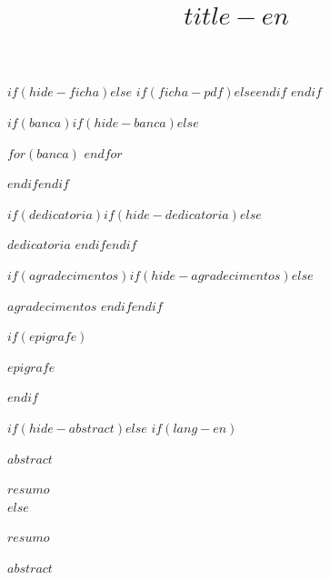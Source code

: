 \documentclass[a4paper,12pt,oneside,onecolumn,final,fleqn]{repUERJ}
\title{$title-en$}
\begin{document}

\frontmatter

\capa
\folhaderosto
$if(hide-ficha)$$else$
$if(ficha-pdf)$$else$\fichacatalografica{}$endif$
$endif$

$if(banca)$$if(hide-banca)$$else$
\begin{folhadeaprovacao}
$for(banca)$  
$endfor$\end{folhadeaprovacao}
$endif$$endif$

$if(dedicatoria)$$if(hide-dedicatoria)$$else$

\vfill
$dedicatoria$
$endif$$endif$

$if(agradecimentos)$$if(hide-agradecimentos)$$else$

$agradecimentos$
$endif$$endif$

$if(epigrafe)$
\pretextualchapter{}

  \vfill
  \begin{flushright}
    $epigrafe$
  \end{flushright}
$endif$

$if(hide-abstract)$$else$
$if(lang-en)$


$abstract$\\

\printkeys



$resumo$\\

\imprimirchaves
$else$


$resumo$\\

\imprimirchaves



$abstract$\\
\end{document}
